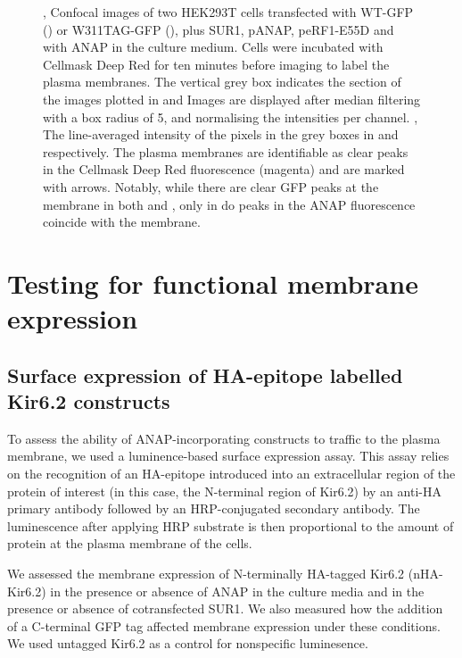 \begin{figure}[h]
\begin{subfigure}[t]{0.35\textwidth}
	\end{subfigure}
	\caption[Confocal imaging]{
	,  Confocal images of two HEK293T cells transfected with WT-GFP () or W311TAG-GFP (), plus SUR1, pANAP, peRF1-E55D and with ANAP in the culture medium.
	Cells were incubated with Cellmask Deep Red for ten minutes before imaging to label the plasma membranes.
	The vertical grey box indicates the section of the images plotted in  and 
	Images are displayed after median filtering with a box radius of 5, and normalising the intensities per channel.
	, The line-averaged intensity of the pixels in the grey boxes in  and  respectively.
	The plasma membranes are identifiable as clear peaks in the Cellmask Deep Red fluorescence (magenta) and are marked with arrows.
	Notably, while there are clear GFP peaks at the membrane in both  and , only in  do peaks in the ANAP fluorescence coincide with the membrane.
	}
\end{figure}


\section{Testing for functional membrane expression}

\subsection{Surface expression of HA-epitope labelled Kir6.2 constructs}

To assess the ability of ANAP-incorporating constructs to traffic to the plasma membrane, we used a luminence-based surface expression assay.
This assay relies on the recognition of an HA-epitope introduced into an extracellular region of the protein of interest (in this case, the N-terminal region of Kir6.2) by an anti-HA primary antibody followed by an HRP-conjugated secondary antibody.
The luminescence after applying HRP substrate is then proportional to the amount of protein at the plasma membrane of the cells.

We assessed the membrane expression of N-terminally HA-tagged Kir6.2 (nHA-Kir6.2) in the presence or absence of ANAP in the culture media and in the presence or absence of cotransfected SUR1.
We also measured how the addition of a C-terminal GFP tag affected membrane expression under these conditions.
We used untagged Kir6.2 as a control for nonspecific luminesence.

